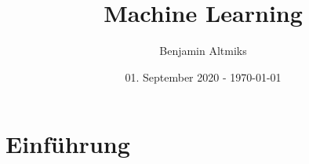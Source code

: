 \documentclass[a4paper,10pt]{scrartcl}
\title{Machine Learning}
\author{Benjamin Altmiks}
\date{01. September 2020 - \today}
\begin{document}
\maketitle
\tableofcontents
\newpage
\section{Einführung}
\end{document}
